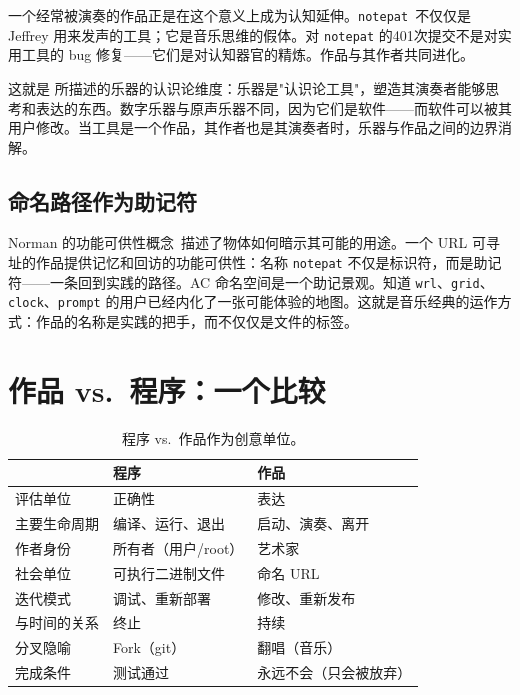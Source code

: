\documentclass[10pt,letterpaper,twocolumn]{article}
\begin{document}
一个经常被演奏的作品正是在这个意义上成为认知延伸。\texttt{notepat}~\citep{scudder2026notepat}不仅仅是 Jeffrey 用来发声的工具；它是音乐思维的假体。对 \texttt{notepat} 的401次提交不是对实用工具的 bug 修复——它们是对认知器官的精炼。作品与其作者共同进化。

这就是 \citet{magnusson2010designing} 所描述的乐器的认识论维度：乐器是"认识论工具"，塑造其演奏者能够思考和表达的东西。数字乐器与原声乐器不同，因为它们是软件——而软件可以被其用户修改。当工具是一个作品，其作者也是其演奏者时，乐器与作品之间的边界消解。

\subsection{命名路径作为助记符}

Norman 的功能可供性概念~\citep{norman1988design}描述了物体如何暗示其可能的用途。一个 URL 可寻址的作品提供记忆和回访的功能可供性：名称 \texttt{notepat} 不仅是标识符，而是助记符——一条回到实践的路径。AC 命名空间是一个助记景观。知道 \texttt{wrl}、\texttt{grid}、\texttt{clock}、\texttt{prompt} 的用户已经内化了一张可能体验的地图。这就是音乐经典的运作方式：作品的名称是实践的把手，而不仅仅是文件的标签。

\section{作品 vs.\ 程序：一个比较}

\begin{table}[h]
\small
\centering
\begin{tabularx}{\columnwidth}{l X X}
\toprule
 & \textbf{程序} & \textbf{作品} \\
\midrule
评估单位 & 正确性 & 表达 \\
主要生命周期 & 编译、运行、退出 & 启动、演奏、离开 \\
作者身份 & 所有者（用户/root） & 艺术家 \\
社会单位 & 可执行二进制文件 & 命名 URL \\
迭代模式 & 调试、重新部署 & 修改、重新发布 \\
与时间的关系 & 终止 & 持续 \\
分叉隐喻 & Fork（git） & 翻唱（音乐） \\
完成条件 & 测试通过 & 永远不会（只会被放弃） \\
\bottomrule
\end{tabularx}
\caption{程序 vs.\ 作品作为创意单位。}
\label{tab:comparison}
\end{table}
\end{document}
